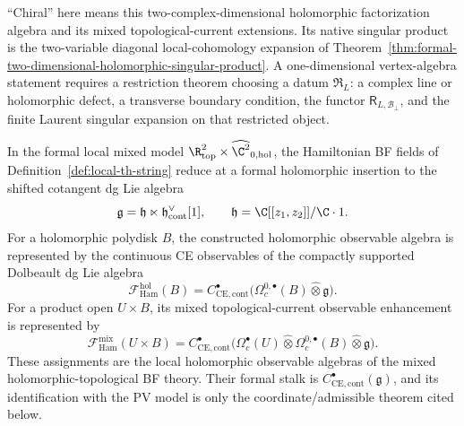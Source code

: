 \documentclass[11pt]{memoir}
\begin{document}
\begin{defn}
  ``Chiral'' here means this two-complex-dimensional holomorphic
  factorization algebra and its mixed topological-current extensions.
  Its native singular product is the two-variable diagonal local-cohomology expansion
  of Theorem~\ref{thm:formal-two-dimensional-holomorphic-singular-product}.  A
  one-dimensional vertex-algebra statement requires a
  restriction theorem choosing a datum \(\mathfrak R_L\): a complex
  line or holomorphic defect, a transverse boundary condition, the
  functor \(\mathsf R_{L,\mathcal B_\perp}\), and the finite Laurent
  singular expansion on that restricted object.
\end{defn}

\begin{prop}\label{prop:local-hamiltonian-factorization-observables}
  In the formal local mixed model
  \(\R^2_{\mathrm{top}}\times\widehat{\C^2}_{0,\mathrm{hol}}\), the
  Hamiltonian BF fields of Definition~\ref{def:local-th-string} reduce
  at a formal holomorphic insertion to the shifted cotangent dg Lie
  algebra
  \[
    \mathfrak g=\mathfrak h\ltimes
    \mathfrak h^\vee_{\mathrm{cont}}[1],
    \qquad
    \mathfrak h=\C[[z_1,z_2]]/\C\cdot1 .
  \]
  For a holomorphic polydisk \(B\), the constructed holomorphic
  observable algebra is represented by the continuous CE observables
  of the compactly supported Dolbeault dg Lie algebra
  \[
    \mathcal F_{\mathrm{Ham}}^{\mathrm{hol}}(B)
    =
    C^\bullet_{\mathrm{CE},\mathrm{cont}}
    \bigl(\Omega_c^{0,\bullet}(B)\widehat\otimes\mathfrak g\bigr).
  \]
  For a product open \(U\times B\), its mixed topological-current
  observable enhancement is represented by
  \[
    \mathcal F_{\mathrm{Ham}}^{\mathrm{mix}}(U\times B)
    =
    C^\bullet_{\mathrm{CE},\mathrm{cont}}
    \bigl(
      \Omega_c^\bullet(U)\widehat\otimes
      \Omega_c^{0,\bullet}(B)\widehat\otimes\mathfrak g
    \bigr).
  \]
  These assignments are the local holomorphic observable algebras of
  the mixed holomorphic-topological BF theory.  Their formal stalk is
  \(C^\bullet_{\mathrm{CE},\mathrm{cont}}(\mathfrak g)\), and its
  identification with the PV model is only the coordinate/admissible
  theorem cited below.
\end{prop}
\end{document}
